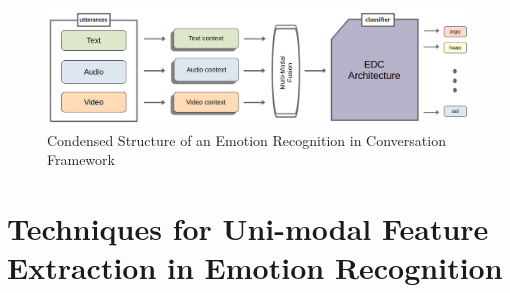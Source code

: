 \vspace*{-1cm}
\begin{figure}[!ht]
    \centering
    \includegraphics[width=\linewidth]{images/method_framework.png}
    \captionsetup{width=\linewidth}
    \caption{Condensed Structure of an Emotion Recognition in Conversation Framework}
    \label{fig:method_framework}
\end{figure}

\section[Techniques for Uni-Modal Feature Extraction in Emotion Recognition]{Techniques for Uni-modal Feature Extraction in \newline Emotion Recognition}
    
